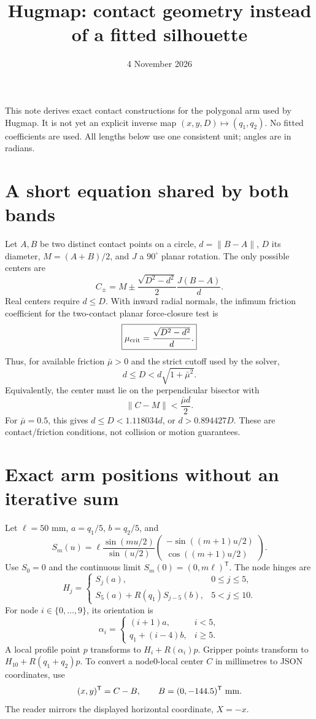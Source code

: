 \documentclass{article}
\title{Hugmap: contact geometry instead of a fitted silhouette}
\author{}\date{4 November 2026}
\begin{document}
\maketitle
\noindent This note derives exact contact constructions for the polygonal arm used by Hugmap. It is not yet an explicit inverse map $(x,y,D)\mapsto(q_1,q_2)$. No fitted coefficients are used. All lengths below use one consistent unit; angles are in radians.

\section{A short equation shared by both bands}
Let $A,B$ be two distinct contact points on a circle, $d=\|B-A\|$, $D$ its diameter, $M=(A+B)/2$, and $J$ a $90^\circ$ planar rotation. The only possible centers are
\[
\boxed{C_\pm=M\pm\frac{\sqrt{D^2-d^2}}{2}\frac{J(B-A)}{d}.}
\]
Real centers require $d\leq D$. With inward radial normals, the infimum friction coefficient for the two-contact planar force-closure test is
\[
\boxed{\mu_{\rm crit}=\frac{\sqrt{D^2-d^2}}{d}.}
\]
Thus, for available friction $\bar\mu>0$ and the strict cutoff used by the solver,
\[
\boxed{d\leq D<d\sqrt{1+\bar\mu^2}.}
\]
Equivalently, the center must lie on the perpendicular bisector with
\[
\|C-M\|<\frac{\bar\mu d}{2}.
\]
For $\bar\mu=0.5$, this gives $d\leq D<1.118034d$, or $d>0.894427D$.
These are contact/friction conditions, not collision or motion guarantees.

\section{Exact arm positions without an iterative sum}
Let $\ell=50$ mm, $a=q_1/5$, $b=q_2/5$, and
\[
S_m(u)=\ell\frac{\sin(mu/2)}{\sin(u/2)}
\begin{pmatrix}-\sin((m+1)u/2)\\\cos((m+1)u/2)\end{pmatrix}.
\]
Use $S_0=0$ and the continuous limit $S_m(0)=(0,m\ell)^\mathsf T$.
The node hinges are
\[
H_j=\begin{cases}S_j(a),&0\leq j\leq5,\\
S_5(a)+R(q_1)S_{j-5}(b),&5<j\leq10.
\end{cases}
\]
For node $i\in\{0,\ldots,9\}$, its orientation is
\[
\alpha_i=\begin{cases}(i+1)a,&i<5,\\q_1+(i-4)b,&i\geq5.\end{cases}
\]
A local profile point $p$ transforms to $H_i+R(\alpha_i)p$.
Gripper points transform to $H_{10}+R(q_1+q_2)p$.
To convert a node0-local center $C$ in millimetres to JSON coordinates, use
\[
(x,y)^\mathsf T=C-B,\qquad B=(0,-144.5)^\mathsf T\ {\rm mm}.
\]
The reader mirrors the displayed horizontal coordinate, $X=-x$.
\end{document}
